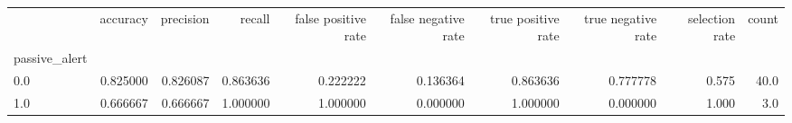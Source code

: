 \begin{tabular}{lrrrrrrrrr}
\toprule
{} &  accuracy &  precision &    recall &  false positive rate &  false negative rate &  true positive rate &  true negative rate &  selection rate &  count \\
passive\_alert &           &            &           &                      &                      &                     &                     &                 &        \\
\midrule
0.0           &  0.825000 &   0.826087 &  0.863636 &             0.222222 &             0.136364 &            0.863636 &            0.777778 &           0.575 &   40.0 \\
1.0           &  0.666667 &   0.666667 &  1.000000 &             1.000000 &             0.000000 &            1.000000 &            0.000000 &           1.000 &    3.0 \\
\bottomrule
\end{tabular}
